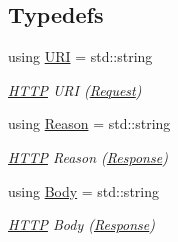 \subsection*{Typedefs}
\begin{DoxyCompactItemize}
\item 
using \mbox{\hyperlink{namespaceo_z_1_1_h_t_t_p_a6d47156e2eac27750983fc1b54bd2ff8}{U\+RI}} = std\+::string
\begin{DoxyCompactList}\small\item\em \mbox{\hyperlink{namespaceo_z_1_1_h_t_t_p}{H\+T\+TP}} U\+RI (\mbox{\hyperlink{classo_z_1_1_h_t_t_p_1_1_request}{Request}}) \end{DoxyCompactList}\item 
using \mbox{\hyperlink{namespaceo_z_1_1_h_t_t_p_afcd8b91e5e8a7b6df0a7b3b298ec3965}{Reason}} = std\+::string
\begin{DoxyCompactList}\small\item\em \mbox{\hyperlink{namespaceo_z_1_1_h_t_t_p}{H\+T\+TP}} Reason (\mbox{\hyperlink{classo_z_1_1_h_t_t_p_1_1_response}{Response}}) \end{DoxyCompactList}\item 
using \mbox{\hyperlink{namespaceo_z_1_1_h_t_t_p_a270c38b9f9b6228ce430fda6d5b150d6}{Body}} = std\+::string
\begin{DoxyCompactList}\small\item\em \mbox{\hyperlink{namespaceo_z_1_1_h_t_t_p}{H\+T\+TP}} Body (\mbox{\hyperlink{classo_z_1_1_h_t_t_p_1_1_response}{Response}}) \end{DoxyCompactList}\end{DoxyCompactItemize}
